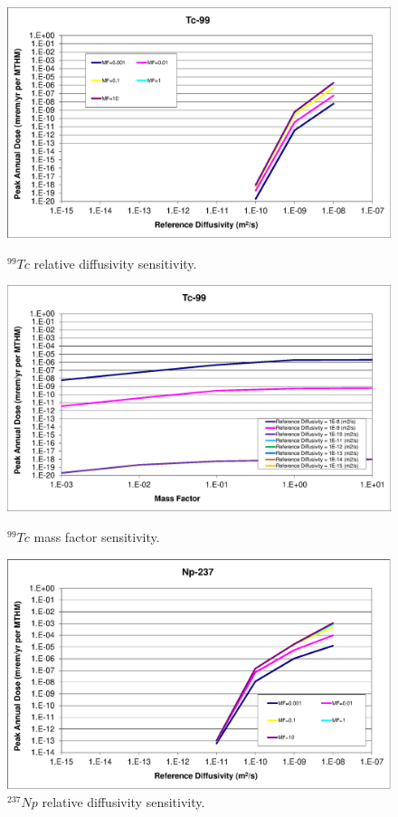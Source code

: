 \begin{figure}[ht!]
\centering
\begin{minipage}[b]{0.45\linewidth}
\includegraphics[width=\linewidth]{./chapters/nuclide_sensitivity/clay/DiffCoeffAndInvEBSFail/Tc-99.eps}
\caption{$^{99}Tc$ relative diffusivity sensitivity.} 
\label{fig:DCInvTc99}

\includegraphics[width=\linewidth]{./chapters/nuclide_sensitivity/clay/DiffCoeffAndInvEBSFail/Tc-99-MF.eps}
\caption{$^{99}Tc$ mass factor sensitivity.}
\label{fig:DCInvTc99MF}

\end{minipage}
\hspace{0.05\linewidth}
\begin{minipage}[b]{0.45\linewidth}

\includegraphics[width=\linewidth]{./chapters/nuclide_sensitivity/clay/DiffCoeffAndInvEBSFail/Np-237.eps}
\caption{$^{237}Np$ relative diffusivity sensitivity.} 
\label{fig:DCInvNp237}


\end{minipage}
\end{figure}

